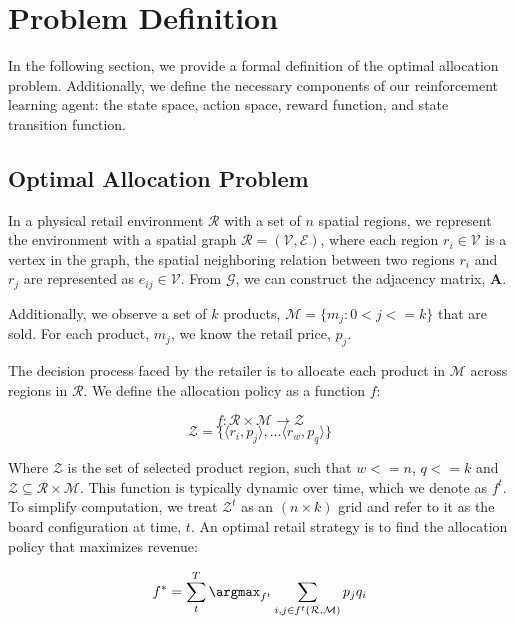 \section{Problem Definition}\label{prob-def}
In the following section, we provide a formal definition of the optimal allocation problem. Additionally, we define the necessary components of our reinforcement learning agent: the state space, action space, reward function, and state transition function.
\subsection{Optimal Allocation Problem}

In a physical retail environment $\mathcal{R}$ with a set of $n$ spatial regions, we represent the environment with a spatial graph $\mathcal{R} = (\mathcal{V}, \mathcal{E})$, where each region $r_i\in \mathcal{V}$ is a vertex in the graph, the spatial neighboring relation between two regions $r_i$ and $r_j$ are represented as $e_{ij}\in \mathcal{V}$. From $\mathcal{G}$, we can construct the adjacency matrix, $\textbf{A}$.

Additionally, we observe a set of $k$ products, $\mathcal{M} = \{m_j : 0 < j <=k\}$ that are sold. For each product, $m_j$, we know the retail price, $p_j$. 

The decision process faced by the retailer is to allocate each product in $\mathcal{M}$ across regions in $\mathcal{R}$. We define the allocation policy as a function $f$:

\begin{equation}
    f: \mathcal{R} \times \mathcal{M} \rightarrow \mathcal{Z}
\end{equation}
\begin{equation}
    \mathcal{Z} = \{\langle r_i, p_j \rangle , ... \langle r_w, p_q \rangle \}
\end{equation}

Where $\mathcal{Z}$ is the set of selected product region, such that $w <= n$, $q <= k$ and $\mathcal{Z} \subseteq \mathcal{R} \times \mathcal{M}$. This function is typically dynamic over time, which we denote as $f^{t}$. To simplify computation, we treat $\mathcal{Z}^{t}$ as an $(n \times k)$ grid and refer to it as the board configuration at time, $t$. An optimal retail strategy is to find the allocation policy that maximizes revenue:

\begin{equation}
    f^{\ast} = \sum_{t}^{T} \argmax_{f^{t}} \sum_{i, j \in f^{t}(\mathcal{R}, \mathcal{M})} p_j q_i
\end{equation}

